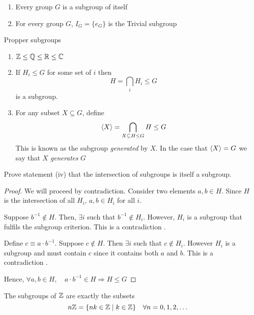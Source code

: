 \documentclass{article}
\begin{document}
\begin{eg}\leavevmode
    \begin{enumerate}
        \item Every group $G$ is a subgroup of itself
        \item For every group $G$, $I_G = \{e_G\}$ is the Trivial subgroup
    \end{enumerate}
    Propper subgroups
    \begin{enumerate}[resume]
        \item $\mathbb{Z} \leq \mathbb{Q} \leq \mathbb{R} \leq \mathbb{C}$
        \item If $H_i \leq G$ for some set of $i$ then
        \[
            H = \bigcap_{i}{H_i} \leq G   
        \]
        is a subgroup.
        \item For any subset $X \subseteq G$, define
        \[
            \left\langle X\right\rangle = \bigcap_{X \subseteq H \leq G}{H} \leq G
        \]
        This is known as the subgroup \emph{generated} by $X$. In the case that $\left\langle X\right\rangle = G$ we say that $X$ \emph{generates} $G$
    \end{enumerate}
\end{eg}

\begin{ex}
    Prove statement (iv) that the intersection of subgroups is itself a subgroup. 
\end{ex}

\begin{proof}
    We will proceed by contradiction. Consider two elements $a, b \in H$. Since $H$ is the intersection of all $H_i$, $a, b \in H_i $ for all $i$.
    
    Suppose $b^{-1} \notin H$. Then, $\exists i$ such that $b^{-1} \notin H_i$. However, $H_i$ is a subgroup that fulfils the subgroup criterion. This is a contradiction \contradiction.

    Define $c \equiv a \cdot b^{-1}$. Suppose $c \notin H$. Then $\exists i$ such that $c \notin H_i$. However $H_i$ is a subgroup and must contain $c$ since it contains both $a$ and $b$. This is a contradiction \contradiction.
    
    Hence, $\forall a,b \in H, \quad a \cdot b^{-1} \in H \Rightarrow H \leq G$
\end{proof}

\begin{prop}
    The subgroups of $\mathbb{Z}$ are exactly the subsets
    \[
        n\mathbb{Z} = \{nk \in \mathbb{Z} \mid k \in \mathbb{Z}\} \quad \forall n = 0, 1, 2, \ldots
    \]
\end{prop}
\end{document}
